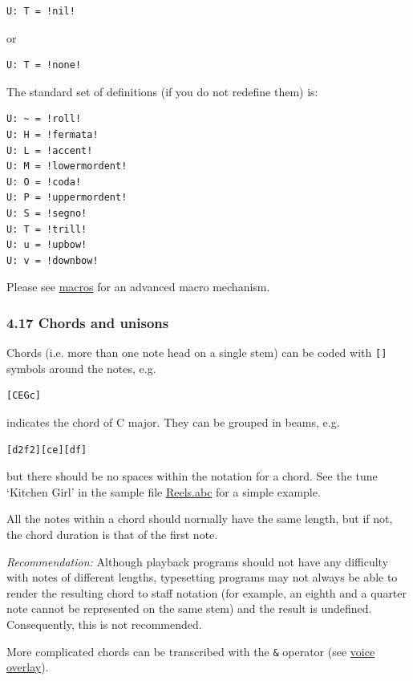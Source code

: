 \documentclass[oneside]{book}
\begin{document}
\begin{verbatim}
U: T = !nil!
\end{verbatim}

or

\begin{verbatim}
U: T = !none!
\end{verbatim}

The standard set of definitions (if you do not redefine them) is:

\begin{verbatim}
U: ~ = !roll!
U: H = !fermata!
U: L = !accent!
U: M = !lowermordent!
U: O = !coda!
U: P = !uppermordent!
U: S = !segno!
U: T = !trill!
U: u = !upbow!
U: v = !downbow!
\end{verbatim}

Please see \protect\hyperlink{macros}{macros} for an advanced macro
mechanism.

\hypertarget{chords_and_unisons}{\subsubsection{4.17 Chords and
unisons}\label{chords_and_unisons}}

Chords (i.e. more than one note head on a single stem) can be coded with
\texttt{{[}{]}} symbols around the notes, e.g.

\begin{verbatim}
[CEGc]
\end{verbatim}

indicates the chord of C major. They can be grouped in beams, e.g.

\begin{verbatim}
[d2f2][ce][df]
\end{verbatim}

but there should be no spaces within the notation for a chord. See the
tune `Kitchen Girl' in the sample file
\protect\hyperlink{reelsabc}{Reels.abc} for a simple example.

All the notes within a chord should normally have the same length, but
if not, the chord duration is that of the first note.

\emph{Recommendation:} Although playback programs should not have any
difficulty with notes of different lengths, typesetting programs may not
always be able to render the resulting chord to staff notation (for
example, an eighth and a quarter note cannot be represented on the same
stem) and the result is undefined. Consequently, this is not
recommended.

More complicated chords can be transcribed with the \texttt{\&} operator
(see \protect\hyperlink{voice_overlay}{voice overlay}).
\end{document}
